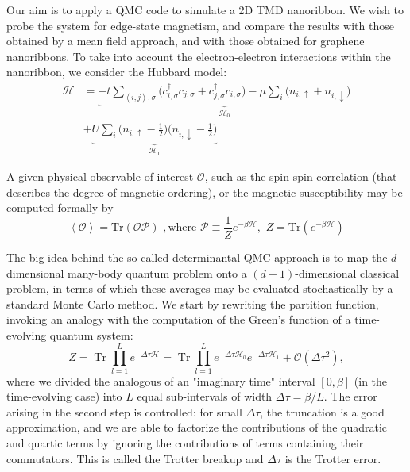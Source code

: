 \documentclass[a0,portrait]{a0poster}
\DeclareMathOperator{\Tr}{Tr} %
\begin{document}
\begin{multicols}{3}
Our aim is to apply a QMC code to simulate a 2D TMD nanoribbon. We wish to probe the system for edge-state magnetism, and compare the results with those obtained by a mean field approach, and with those obtained for graphene nanoribbons. To take into account the electron-electron interactions within the nanoribbon, we consider the Hubbard model:
\vspace{-0.3cm}
\begin{equation}\label{eq:hubbard}
\begin{split}
\mathcal{H} &= \underbrace{-t \sum_{\left\langle i, j \right \rangle, \sigma} \bigg( c_{i,\sigma}^\dagger c_{j,\sigma} + c_{j,\sigma}^\dagger c_{i,\sigma} \bigg) -\mu \sum_i \bigg( n_{i,\uparrow} + n_{i,\downarrow} \bigg)}_{\mathcal{H}_0} \\ 
&+\underbrace{U \sum_{i} \bigg( n_{i,\uparrow} - \frac{1}{2} \bigg) \bigg( n_{i,\downarrow} - \frac{1}{2} \bigg)}_{\mathcal{H}_1}
\end{split}
\end{equation}
\vspace{-1cm}

A given physical observable of interest $\mathcal{O}$, such as the spin-spin correlation (that describes the degree of magnetic ordering), or the magnetic susceptibility may be computed formally by
\vspace{-0.5cm}
\begin{equation}\label{eq:observables}
\left\langle \mathcal{O} \right\rangle = \text{Tr} ( \mathcal{O} \mathcal{P} )\, \, , \text{where} \,\, \mathcal{P} \equiv \frac{1}{Z} e^{-\beta \mathcal{H} } , \,\, Z = \text{Tr} ( e^{-\beta \mathcal{H} } ) 
\end{equation}
\vspace{-1cm}

The big idea behind the so called determinantal QMC approach is to map the $d$-dimensional many-body quantum problem onto a $(d+1)$-dimensional classical problem, in terms of which these averages may be evaluated stochastically by a standard Monte Carlo method. We start by rewriting the partition function, invoking an analogy with the computation of the Green's function of a time-evolving quantum system:
\vspace{-0.5cm}
\begin{equation}
Z = \Tr \prod_{l = 1}^L e^{-\Delta \tau \mathcal{H} } =  \Tr \prod_{l = 1}^L e^{-\Delta \tau \mathcal{H}_0}  e^{-\Delta \tau \mathcal{H}_1} + \mathcal{O}(\Delta \tau^2) ,
\end{equation}
where we divided the analogous of an "imaginary time" interval $[0, \beta]$ (in the time-evolving case) into $L$ equal sub-intervals of width $\Delta \tau = \beta / L$. The error arising in the second step is controlled: for small $\Delta \tau$, the truncation is a good approximation, and we are able to factorize the contributions of the quadratic and quartic terms by ignoring the contributions of terms containing their commutators. This is called the Trotter breakup and $\Delta \tau$ is the Trotter error.


\end{multicols}
\end{document}
